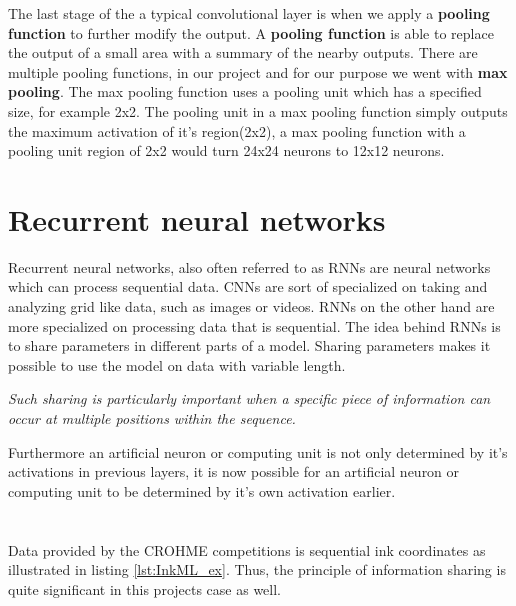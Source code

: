 The last stage of the a typical convolutional layer is when we apply a \textbf{pooling function}\parencite{zhou_computation_1988} to further modify the output. A \textbf{pooling function} is able to replace the output of a small area with a summary of the nearby outputs. There are multiple pooling functions, in our project and for our purpose we went with \textbf{max pooling}. The max pooling function uses a pooling unit which has a specified size, for example 2x2. The pooling unit in a max pooling function simply outputs the maximum activation of it's region(2x2), a max pooling function with a pooling unit region of 2x2 would turn 24x24 neurons to 12x12 neurons. \parencite{goodfellow_deep_2016} \parencite{nielsen_neural_2015}

\section{Recurrent neural networks}
Recurrent neural networks, also often referred to as RNNs \parencite{rumelhart_learning_1986} are neural networks which can process sequential data. CNNs are sort of specialized on taking and analyzing grid like data, such as images or videos. RNNs on the other hand are more specialized on processing data that is sequential. The idea behind RNNs is to share parameters in different parts of a model. Sharing parameters makes it possible to use the model on data with variable length. \begin{displayquote}
 \textit{Such sharing is particularly important when a specific piece of information can occur at multiple positions within the sequence.}
\end{displayquote}
Furthermore an artificial neuron or computing unit is not only determined by it's activations in previous layers, it is now possible for an artificial neuron or computing unit to be determined by it's own activation earlier. \\ \parencite{goodfellow_deep_2016} \parencite{nielsen_neural_2015} \\\\
Data provided by the CROHME competitions is sequential ink coordinates as illustrated in listing \ref{lst:InkML_ex}. Thus, the principle of information sharing is quite significant in this projects case as well. %

